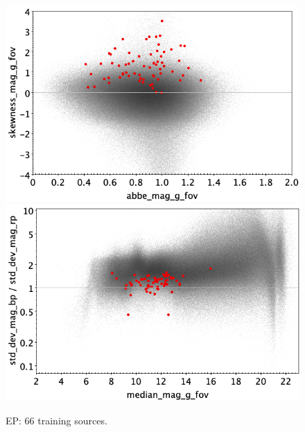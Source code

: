 \documentclass[longauth]{aa}
\begin{document}
\begin{appendix}
\begin{figure}
\vspace{4mm}
 \includegraphics[width=0.45\hsize]{figures/appendix/EP_trn_ask.png}  %
\hspace{2mm}
 \includegraphics[width=0.45\hsize]{figures/appendix/EP_trn_msdr.png}  \\ %
\vspace{4mm}
 \caption{EP: 66 training sources.}  
 \label{fig:app:EP_trn}
\end{figure}


\end{appendix}
\end{document}
